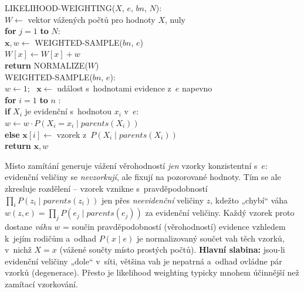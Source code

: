 \begin{algo}
\ttfamily\small
LIKELIHOOD-WEIGHTING($X$, $e$, $bn$, $N$):\\
\hspace*{1.5em}$W\leftarrow$ vektor vážených počtů pro hodnoty $X$, nuly\\
\hspace*{1.5em}\textbf{for} $j=1$ \textbf{to} $N$:\\
\hspace*{3em}$\mathbf{x},w\leftarrow$ WEIGHTED-SAMPLE($bn$, $e$)\\
\hspace*{3em}$W[x]\leftarrow W[x]+w$ \\
\hspace*{1.5em}\textbf{return} NORMALIZE($W$)\\[2pt]
WEIGHTED-SAMPLE($bn$, $e$):\\
\hspace*{1.5em}$w\leftarrow 1$; \ $\mathbf{x}\leftarrow$ událost s~hodnotami evidence z~$e$ napevno\\
\hspace*{1.5em}\textbf{for} $i=1$ \textbf{to} $n$ :\\
\hspace*{3em}\textbf{if} $X_i$ je evidenční s~hodnotou $x_i$ v~$e$:\\
\hspace*{4.5em}$w\leftarrow w\cdot P(X_i{=}x_i\mid \mathit{parents}(X_i))$ \\
\hspace*{3em}\textbf{else} $\mathbf{x}[i]\leftarrow$ vzorek z~$P(X_i\mid \mathit{parents}(X_i))$\\
\hspace*{1.5em}\textbf{return} $\mathbf{x},w$
\end{algo}

\begin{intuice}
Místo zamítání generuje vážení věrohodností \emph{jen} vzorky konzistentní s~$e$: evidenční veličiny se \emph{nevzorkují}, ale fixují na pozorované hodnoty. Tím se ale zkresluje rozdělení -- vzorek vznikne s~pravděpodobností $\prod_i P(z_i\mid \mathit{parents}(z_i))$ jen přes \emph{neevidenční} veličiny $z$, kdežto „chybí`` váha $w(z,e)=\prod_j P(e_j\mid \mathit{parents}(e_j))$ za evidenční veličiny. Každý vzorek proto dostane \emph{váhu} $w$ = součin pravděpodobností (věrohodností) evidence vzhledem k~jejím rodičům a~odhad $P(x\mid e)$ je normalizovaný součet vah těch vzorků, v~nichž $X{=}x$ (vážené součty místo prostých počtů). \textbf{Hlavní slabina:} jsou-li evidenční veličiny „dole`` v~síti, většina vah je nepatrná a~odhad ovládne pár vzorků (degenerace). Přesto je likelihood weighting typicky mnohem účinnější než zamítací vzorkování.
\end{intuice}

